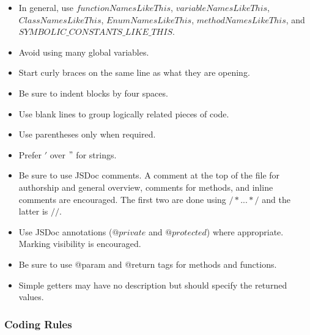 \documentclass[12pt]{article}
\begin{document}
\begin{itemize}

\item In general, use $functionNamesLikeThis$, $variableNamesLikeThis$, $ClassNamesLikeThis$, $EnumNamesLikeThis$, $methodNamesLikeThis$, and $SYMBOLIC\_CONSTANTS\_LIKE\_THIS$.

\item Avoid using many global variables.

\item Start curly braces on the same line as what they are opening.

\item Be sure to indent blocks by four spaces.

\item Use blank lines to group logically related pieces of code.

\item Use parentheses only when required.

\item Prefer $'$ over $"$ for strings.

\item Be sure to use JSDoc comments.  A comment at the top of the file for authorship and general overview, comments for methods, and inline comments are encouraged.  The first two are done using $/*. . . */$ and the latter is $//$.

\item Use JSDoc annotations ($@private$ and $@protected$) where appropriate.  Marking visibility is encouraged.

\item Be sure to use @param and @return tags for methods and functions.

\item Simple getters may have no description but should specify the returned values.

\end{itemize}



\subsubsection{Coding Rules}
\end{document}

